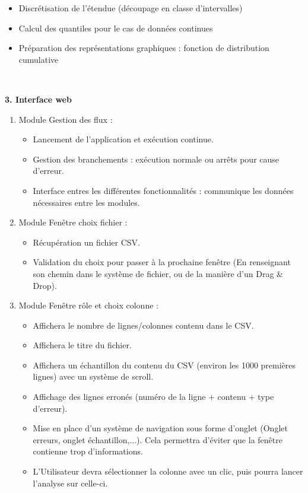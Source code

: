 \begin{description}[style=unboxed,leftmargin=0.2cm]
\begin{enumerate}
						\begin{itemize}
						\item Discrétisation de l'étendue (découpage en classe d'intervalles)
						\item Calcul des quantiles pour le cas  de données continues
						\item Préparation des représentations graphiques : fonction de distribution cumulative
						\end{itemize}
				\end{enumerate}
				~\\
				\item\textbf{3. Interface web}
				\begin{enumerate}
					\item Module Gestion des flux :
						\begin{itemize}
						\item Lancement de l'application et exécution continue.
						\item Gestion des branchements : exécution normale ou arrêts pour cause d'erreur.
						\item Interface entres les différentes fonctionnalités : communique les données nécessaires entre les modules.
						\end{itemize}
						
					\item Module Fenêtre choix fichier :
						\begin{itemize}
						\item Récupération un fichier CSV.
						\item Validation du choix pour passer à la prochaine fenêtre (En renseignant son chemin dans le système de fichier, ou de la manière d'un Drag \& Drop).
						\end{itemize}
						
					\item Module Fenêtre rôle et choix colonne :
						\begin{itemize}
						\item Affichera le nombre de lignes/colonnes contenu dans le CSV.
						\item Affichera le titre du fichier.
						\item Affichera un échantillon du contenu du CSV (environ les 1000 premières lignes) avec un système de scroll.
						\item Affichage des lignes erronés (numéro de la ligne + contenu + type d'erreur).
						\item Mise en place d'un système de navigation sous forme d'onglet (Onglet erreurs, onglet échantillon,...). Cela permettra d'éviter que la fenêtre contienne trop d'informations.
						\item L'Utilisateur devra sélectionner la colonne avec un clic, puis pourra lancer l'analyse sur celle-ci. 
						\end{itemize}
					

\end{enumerate}
\end{description}
